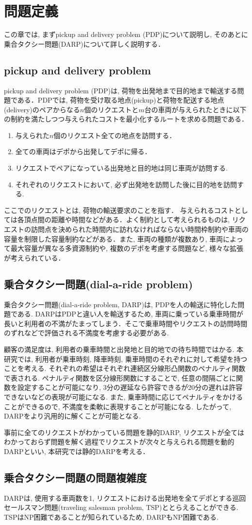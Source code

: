 \chapter{問題定義}\label{definition}
この章では, まずpickup and delivery problem (PDP)について説明し, そのあとに乗合タクシー問題(DARP)について詳しく説明する．
\section{pickup and delivery problem}
pickup and delivery problem (PDP)は, 荷物を出発地まで目的地まで輸送する問題である．PDPでは, 荷物を受け取る地点(pickup)と荷物を配送する地点(delivery)のペアからなる$n$個のリクエストと$m$台の車両が与えられたときに以下の制約を満たしつつ与えられたコストを最小化するルートを求める問題である．
\begin{enumerate}
 \item 与えられた$n$個のリクエスト全ての地点を訪問する．
 \item 全ての車両はデポから出発してデポに帰る．
 \item リクエストでペアになっている出発地と目的地は同じ車両が訪問する.
 \item それぞれのリクエストにおいて, 必ず出発地を訪問した後に目的地を訪問する.
\end{enumerate}
ここでのリクエストとは, 荷物の輸送要求のことを指す．
与えられるコストとしては各頂点間の距離や時間などがある．よく制約として考えられるものは, リクエストの訪問点を決められた時間内に訪れなければならない時間枠制約や車両の容量を制限した容量制約などがある．また, 車両の種類が複数あり, 車両によって最大容量が異なる多資源制約や, 複数のデポを考慮する問題など, 様々な拡張が考えられている．

\section{乗合タクシー問題(dial-a-ride problem)}
乗合タクシー問題(dial-a-ride problem, DARP)は, PDPを人の輸送に特化した問題である. DARPはPDPと違い人を輸送するため, 車両に乗っている乗車時間が長いと利用者の不満がたまってしまう．そこで乗車時間やリクエストの訪問時間のずれなどで評価される不満度を考慮する必要がある.

顧客の満足度は, 利用者の乗車時間と出発地と目的地での待ち時間ではかる. 本研究では, 利用者が乗車時刻, 降車時刻, 乗車時間のそれぞれに対して希望を持つことを考える. それぞれの希望はそれぞれ連続区分線形凸関数のペナルティ関数で表される. ペナルティ関数を区分線形関数にすることで, 任意の間隔ごとに関数を設定することが可能になり, 3分の遅延なら許容できるが20分の遅れは許容できないなどの表現が可能になる. また, 乗車時間に応じてペナルティをかけることができるので, 不満度を柔軟に表現することが可能になる. したがって, DARPをより汎用的に解くことが可能となる.

事前に全てのリクエストがわかっている問題を静的DARP, リクエストが全てはわかっておらず問題を解く過程でリクエストが次々と与えられる問題を動的DARPといい, 本研究では静的DARPを考える．

\section{乗合タクシー問題の問題複雑度}
DARPは, 使用する車両数を1, リクエストにおける出発地を全てデポとする巡回セールスマン問題(traveling salesman problem, TSP)ととらえることができる. TSPはNP困難\cite{TSP}であることが知られているため, DARPもNP困難である.
